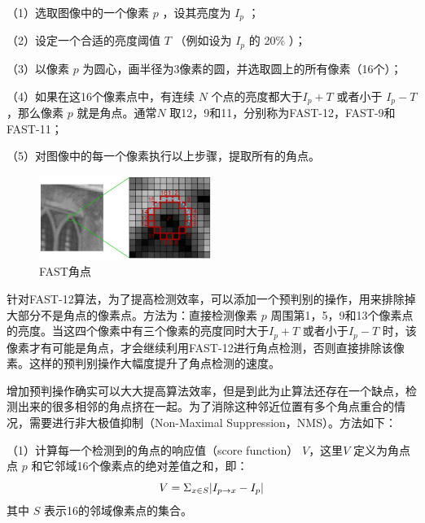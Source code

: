 （1）选取图像中的一个像素 $p$ ，设其亮度为 $I_p $ ；

（2）设定一个合适的亮度阈值 $T$ （例如设为 $I_p $ 的 20\%  ）；

（3）以像素  $p$  为圆心，画半径为3像素的圆，并选取圆上的所有像素（16个）；

（4）如果在这16个像素点中，有连续 $N $  个点的亮度都大于$I_p+T $ 或者小于 $I_p-T $，那么像素 $p $ 就是角点。通常$N $  取12，9和11，分别称为FAST-12，FAST-9和FAST-11；

（5）对图像中的每一个像素执行以上步骤，提取所有的角点。
\begin{figure}[h]\setlength{\belowcaptionskip}{-12pt}
	\centering
	\includegraphics[width=0.5\textwidth]{figures/chapter3/fig3_1}
	\caption{FAST角点}\label{fig3_1}
\end{figure}

针对FAST-12算法，为了提高检测效率，可以添加一个预判别的操作，用来排除掉大部分不是角点的像素点。方法为：直接检测像素 $p$ 周围第1，5，9和13个像素点的亮度。当这四个像素中有三个像素的亮度同时大于$I_p+T $ 或者小于$I_p-T $ 时，该像素才有可能是角点，才会继续利用FAST-12进行角点检测，否则直接排除该像素。这样的预判别操作大幅度提升了角点检测的速度。

增加预判操作确实可以大大提高算法效率，但是到此为止算法还存在一个缺点，检测出来的很多相邻的角点挤在一起。为了消除这种邻近位置有多个角点重合的情况，需要进行非大极值抑制（Non-Maximal Suppression，NMS）。方法如下：

（1）计算每一个检测到的角点的响应值（score function） $V$，这里$V$ 定义为角点点 $p$ 和它邻域16个像素点的绝对差值之和，即：
\[
\setlength{\abovedisplayskip}{6pt}
\setlength{\belowdisplayskip}{6pt}
V = \Sigma_{x \in S} |I_{p\rightarrow x} - I_p|
\] 
其中 $S$ 表示16的邻域像素点的集合。

